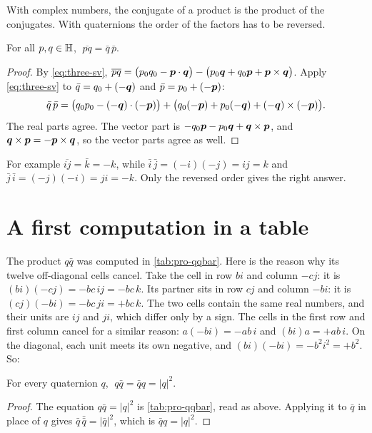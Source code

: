 With complex numbers, the conjugate of a product is the product of the conjugates. With quaternions the order of the factors has to be reversed.

\begin{proposition}\label{prop:length-reverse}
For all $p,q\in\mathbb{H}$, $\;\overline{pq}=\bar q\,\bar p$.
\end{proposition}

\begin{proof}
By \eqref{eq:three-sv},
$\overline{pq}=\bigl(p_0q_0-\bm{p}\cdot\bm{q}\bigr)-\bigl(p_0\bm{q}+q_0\bm{p}+\bm{p}\times\bm{q}\bigr)$.
Apply \eqref{eq:three-sv} to $\bar q=q_0+(-\bm{q})$ and $\bar p=p_0+(-\bm{p})$:
\[
  \bar q\,\bar p=\bigl(q_0p_0-(-\bm{q})\cdot(-\bm{p})\bigr)+\bigl(q_0(-\bm{p})+p_0(-\bm{q})+(-\bm{q})\times(-\bm{p})\bigr).
\]
The real parts agree. The vector part is $-q_0\bm{p}-p_0\bm{q}+\bm{q}\times\bm{p}$, and $\bm{q}\times\bm{p}=-\bm{p}\times\bm{q}$, so the vector parts agree as well.
\end{proof}

For example $\overline{ij}=\bar k=-k$, while $\bar i\,\bar j=(-i)(-j)=ij=k$ and $\bar j\,\bar i=(-j)(-i)=ji=-k$. Only the reversed order gives the right answer.

\section{A first computation in a table}

The product $q\bar q$ was computed in \cref{tab:pro-qqbar}. Here is the reason why its twelve off-diagonal cells cancel. Take the cell in row $bi$ and column $-cj$: it is $(bi)(-cj)=-bc\,ij=-bc\,k$. Its partner sits in row $cj$ and column $-bi$: it is $(cj)(-bi)=-bc\,ji=+bc\,k$. The two cells contain the same real numbers, and their units are $ij$ and $ji$, which differ only by a sign. The cells in the first row and first column cancel for a similar reason: $a(-bi)=-ab\,i$ and $(bi)a=+ab\,i$. On the diagonal, each unit meets its own negative, and $(bi)(-bi)=-b^2i^2=+b^2$. So:

\begin{proposition}\label{prop:length-qqbar}
For every quaternion $q$, $\;q\bar q=\bar q q=|q|^2$.
\end{proposition}

\begin{proof}
The equation $q\bar q=|q|^2$ is \cref{tab:pro-qqbar}, read as above. Applying it to $\bar q$ in place of $q$ gives $\bar q\,\bar{\bar q}=|\bar q|^2$, which is $\bar q q=|q|^2$.
\end{proof}


